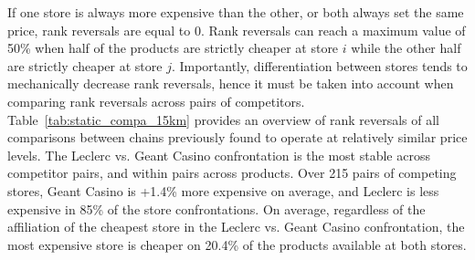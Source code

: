 \documentclass[english]{article}
\begin{document}
If one store is always more expensive than the other, or both always set the same price, rank reversals are equal to 0. Rank reversals can reach a maximum value of 50\% when half of the products are strictly cheaper at store $i$ while the other half are strictly cheaper at store $j$. Importantly, differentiation between stores tends to mechanically decrease rank reversals, hence it must be taken into account when comparing rank reversals across pairs of competitors. Table~\ref{tab:static_compa_15km} provides an overview of rank reversals of all comparisons between chains previously found to operate at relatively similar price levels. The Leclerc vs. Geant Casino confrontation is the most stable across competitor pairs, and within pairs across products. Over 215 pairs of competing stores, Geant Casino is +1.4\% more expensive on average, and Leclerc is less expensive in 85\% of the store confrontations. On average, regardless of the affiliation of the cheapest store in the Leclerc vs. Geant Casino confrontation, the most expensive store is cheaper on 20.4\% of the products available at both stores.
\end{document}
